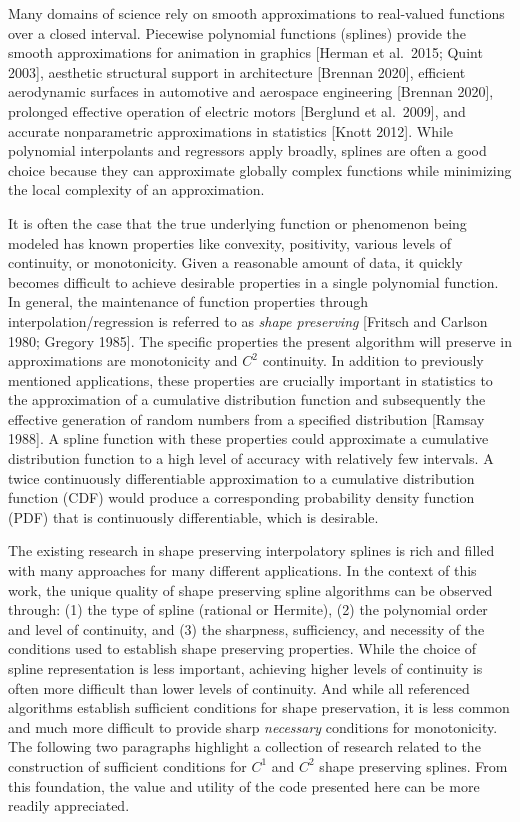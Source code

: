 
Many domains of science rely on smooth approximations to real-valued
functions over a closed interval. Piecewise polynomial functions
(splines) provide the smooth approximations for animation in graphics
[Herman et al.\ 2015; Quint 2003], aesthetic structural support in
architecture [Brennan 2020], efficient aerodynamic surfaces in
automotive and aerospace engineering [Brennan 2020], prolonged
effective operation of electric motors [Berglund et al.\ 2009], and
accurate nonparametric approximations in statistics [Knott
2012]. While polynomial interpolants and regressors apply broadly,
splines are often a good choice because they can approximate globally
complex functions while minimizing the local complexity of an
approximation.

It is often the case that the true underlying function or phenomenon
being modeled has known properties like convexity, positivity,
various levels of continuity, or monotonicity. Given a reasonable
amount of data, it quickly becomes difficult to achieve desirable
properties in a single polynomial function. In general, the
maintenance of function properties through interpolation/regression is
referred to as {\it shape preserving} [Fritsch and Carlson 1980;
Gregory 1985]. The specific properties the present algorithm will
preserve in approximations are monotonicity and $C^2$ continuity. In
addition to previously mentioned applications, these properties are
crucially important in statistics to the approximation of a cumulative
distribution function and subsequently the effective generation of
random numbers from a specified distribution [Ramsay 1988].  A spline
function with these properties could approximate a cumulative
distribution function to a high level of accuracy with relatively few
intervals. A twice continuously differentiable approximation to a
cumulative distribution function (CDF) would produce a corresponding
probability density function (PDF) that is continuously
differentiable, which is desirable.

\beginred

The existing research in shape preserving interpolatory splines is
rich and filled with many approaches for many different
applications. In the context of this work, the unique quality of shape
preserving spline algorithms can be observed through: (1) the type of
spline (rational or Hermite), (2) the polynomial order and level of
continuity, and (3) the sharpness, sufficiency, and necessity of the
conditions used to establish shape preserving properties. While the
choice of spline representation is less important, achieving higher
levels of continuity is often more difficult than lower levels of
continuity. And while all referenced algorithms establish sufficient
conditions for shape preservation, it is less common and much more
difficult to provide sharp {\it necessary} conditions for
monotonicity. The following two paragraphs highlight a collection of
research related to the construction of sufficient conditions for
$C^1$ and $C^2$ shape preserving splines. From this foundation, the
value and utility of the code presented here can be more readily
appreciated.

